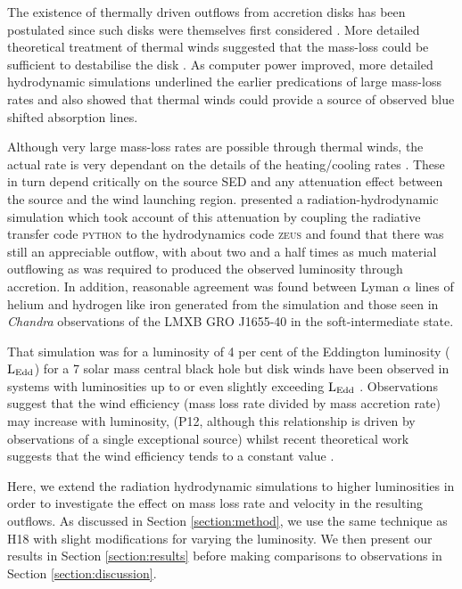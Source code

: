 \documentclass[a4paper,fleqn,usenatbib]{mnras}
\begin{document}
The existence of thermally driven outflows from accretion disks has been postulated since such disks were themselves
first considered \citep{1973A&A....24..337S}. More detailed theoretical treatment of thermal winds \citep{1983ApJ...271...70B} suggested that the mass-loss could be sufficient to destabilise the disk \citep{1986ApJ...306...90S}.
As computer power improved, more detailed hydrodynamic simulations  \citep{1996ApJ...461..767W,2006ApJ...652L.117N,2010ApJ...719..515L,2015ApJ...807..107H} underlined the earlier predications of large mass-loss rates and also showed that thermal winds could provide a source of observed blue shifted absorption lines.

Although very large mass-loss rates are possible through thermal winds, the actual rate is very 
dependant on the details
 of the heating/cooling rates  \citep{2017ApJ...836...42H}. These 
in turn depend critically on the source SED \citep{2017MNRAS.467.4161D} and any attenuation effect between the source and the wind
launching region. \citet[hereafter H18]{2018MNRAS.479.3651H} presented a radiation-hydrodynamic simulation which 
took account
of this attenuation by coupling the radiative transfer code  \textsc{python} to the hydrodynamics code \textsc{zeus} and 
found that there was still an appreciable outflow, with about two and a half times as much material outflowing as was required
to produced the observed luminosity through accretion. In addition, reasonable agreement was found between 
Lyman $\alpha$ lines of helium and hydrogen like iron generated from the simulation and those seen in \emph{Chandra} 
observations of the LMXB GRO J1655-40 in the soft-intermediate state. 

That simulation was for a luminosity of 4 per cent of the Eddington luminosity  ($\rm{L_{Edd}}$) for a 7 solar mass 
central black hole but disk winds have been observed in systems with luminosities up to or even slightly exceeding 
$\rm{L_{Edd}}$ \citep[][herafter P12]{2012MNRAS.422L..11P}.  Observations
suggest that the wind efficiency (mass loss rate divided by mass accretion rate) may increase with luminosity, 
(P12, although this relationship is driven by observations of a single exceptional source) whilst recent theoretical work 
suggests that the wind efficiency tends to a constant value \citep[][hereafter D18]{2018MNRAS.473..838D}.

Here, we extend the radiation hydrodynamic simulations to higher 
luminosities in order to investigate the effect on mass loss rate and velocity in the resulting outflows. 
As discussed in Section \ref{section:method}, we  use the same technique as H18 with slight modifications for varying the luminosity.
We then present our results in Section \ref{section:results} before making comparisons to observations in Section \ref{section:discussion}.
\end{document}
